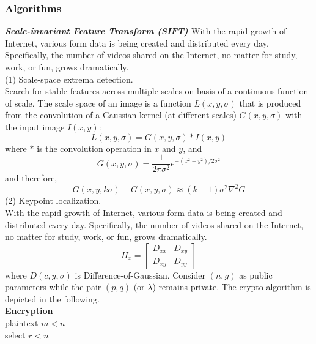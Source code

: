 \documentclass[a4paper,12pt,UTF8]{ctexart}
\begin{document}
\begin{spacing}{1.1}
\subsubsection{Algorithms} \label{siftbovw}
\textbf{\emph{Scale-invariant Feature Transform (SIFT)} \cite{DBLP:journals/ijcv/Lowe04}} With the rapid growth of Internet, various form data is being created and distributed every day. Specifically, the number of videos shared on the Internet, no matter for study, work, or fun, grows dramatically. 
\\\indent(1) Scale-space extrema detection.
\\\indent Search for stable features across multiple scales on basis of a continuous function of scale. The scale space of an image is a function $L(x,y,\sigma)$ that is produced from the convolution of a Gaussian kernel (at different scales) $G(x,y,\sigma)$ with the input image $I(x,y)$:
\begin{equation}
L(x,y,\sigma)=G(x,y,\sigma)*I(x,y)
\end{equation}
where $*$ is the convolution operation in $x$ and $y$, and
\begin{equation}
G(x,y,\sigma)=\dfrac{1}{2\pi\sigma^2}e^{-(x^2+y^2)/2\sigma^2}
\end{equation}
and therefore,
\begin{equation}
G(x,y,k\sigma)-G(x,y,\sigma)\approx(k-1)\sigma^2\nabla^2G
\end{equation}
\indent(2) Keypoint localization. 
\\\indent With the rapid growth of Internet, various form data is being created and distributed every day. Specifically, the number of videos shared on the Internet, no matter for study, work, or fun, grows dramatically. 
\begin{equation}
H_x=\left[ \begin{array}{cc}
D_{xx} & D_{xy}\\
D_{xy} & D_{yy}
\end{array} 
\right]
\end{equation}
where $D(c,y,\sigma)$ is Difference-of-Gaussian.
\indent Consider $(n,g)$ as public parameters while the pair $(p,q)$ (or $\lambda$) remains private. The crypto-algorithm is depicted in the following.
\\\indent\indent\indent\indent\indent \textbf{Encryption}
\\\indent\indent\indent\indent\indent\indent\indent plaintext $m<n$
\\\indent\indent\indent\indent\indent\indent\indent select $r<n$

\end{spacing}
\end{document}
